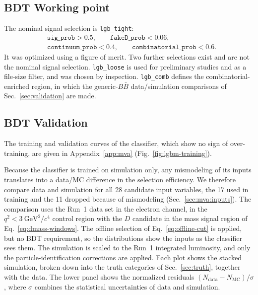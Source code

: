 \subsection{BDT Working point}
\label{sec:mva:wp}

The nominal signal selection is \texttt{lgb\_tight}:
\begin{equation}
  \begin{aligned}
    &\texttt{sig\_prob} > 0.5, \qquad
     \texttt{fakeD\_prob} < 0.06, \\
    &\texttt{continuum\_prob} < 0.4, \qquad
     \texttt{combinatorial\_prob} < 0.6 .
  \end{aligned}
  \label{eq:lgb-tight}
\end{equation}
It was optimized using a figure of merit.
Two further selections exist and are not the nominal signal selection.
\texttt{lgb\_loose} is used for preliminary studies and as a file-size filter,
and was chosen by inspection.
\texttt{lgb\_comb} defines the combinatorial-enriched region, in which the
generic-$B\bar{B}$ data/simulation comparisons of Sec.~\ref{sec:validation}
are made.

\subsection{BDT Validation}
\label{sec:mva:validation}

The training and validation curves of the classifier, which show no sign of
over-training, are given in Appendix~\ref{app:mva}
(Fig.~\ref{fig:lgbm-training}).

Because the classifier is trained on simulation only, any mismodeling of its
inputs translates into a data/MC difference in the selection efficiency.
We therefore compare data and simulation for all 28 candidate input
variables, the 17 used in training and the 11 dropped because of
mismodeling (Sec.~\ref{sec:mva:inputs}).
The comparison uses the Run~1 data set in the electron channel, in the
$q^{2} < 3~\mathrm{GeV}^{2}/c^{4}$ control region with the $D$ candidate in the
mass signal region of Eq.~\eqref{eq:dmass-windows}.
The offline selection of Eq.~\eqref{eq:offline-cut} is applied, but no BDT
requirement, so the distributions show the inputs as the classifier sees them.
The simulation is scaled to the Run~1 integrated luminosity, and only the
particle-identification corrections are applied.
Each plot shows the stacked simulation, broken down into the truth categories
of Sec.~\ref{sec:truth}, together with the data. The lower panel shows the
normalized residuals $(N_{\mathrm{data}} - N_{\mathrm{MC}})/\sigma$, where
$\sigma$ combines the statistical uncertainties of data and simulation.

